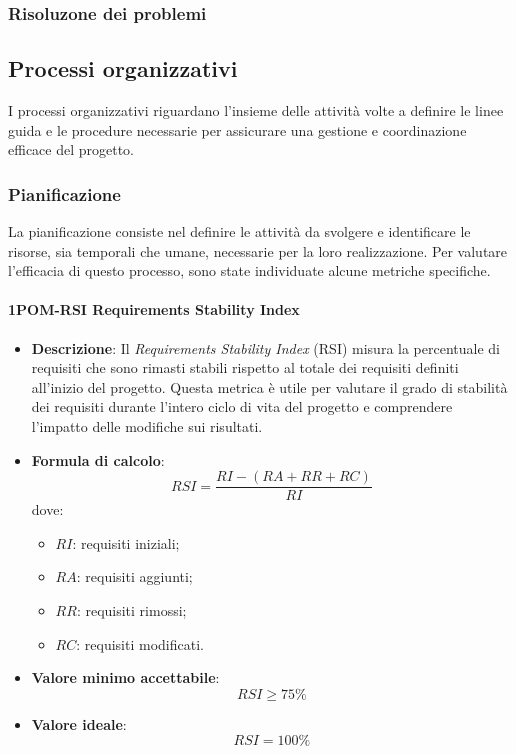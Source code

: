 \subsubsection{Risoluzone dei problemi}




\subsection{Processi organizzativi}
I processi organizzativi riguardano l'insieme delle attività volte a definire le linee guida e le procedure necessarie per assicurare una gestione e coordinazione efficace del progetto.

\subsubsection{Pianificazione}
La pianificazione consiste nel definire le attività da svolgere e identificare le risorse, sia temporali che umane, necessarie per la loro realizzazione. Per valutare l'efficacia di questo processo, sono state individuate alcune metriche specifiche.

\paragraph*{1POM-RSI Requirements Stability Index}
\begin{itemize}
    \item \textbf{Descrizione}: Il \textit{Requirements Stability Index} (RSI) misura la percentuale di requisiti che sono rimasti stabili rispetto al totale dei requisiti definiti all’inizio del progetto. Questa metrica è utile per valutare il grado di stabilità dei requisiti durante l’intero ciclo di vita del progetto e comprendere l’impatto delle modifiche sui risultati.
    \item \textbf{Formula di calcolo}: 
    \begin{equation*}
        RSI = \frac{RI - (RA + RR + RC)}{RI}
    \end{equation*}
    dove:
    \begin{itemize}
        \item $RI$: requisiti iniziali;
        \item $RA$: requisiti aggiunti;
        \item $RR$: requisiti rimossi;
        \item $RC$: requisiti modificati.
    \end{itemize}
    \item \textbf{Valore minimo accettabile}: 
    \begin{equation*}
        RSI \geq 75\%
    \end{equation*}
    \item \textbf{Valore ideale}: 
    \begin{equation*}
        RSI = 100\%
    \end{equation*}
\end{itemize}
